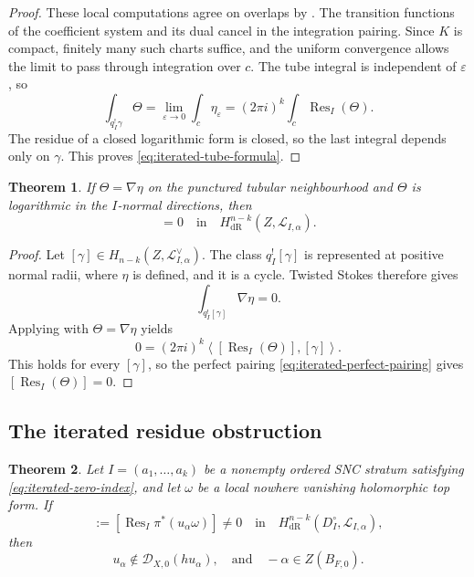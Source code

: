\documentclass[12pt]{amsart}
\numberwithin{equation}{section}
\theoremstyle{plain}
\newtheorem{theorem}{Theorem}[section]
\theoremstyle{definition}
\theoremstyle{remark}
\theoremstyle{definition}
\DeclareMathOperator{\Res}{Res}
\newcommand{\D}{\mathscr D}
\newcommand{\Lcal}{\mathscr L}
\begin{document}
\begin{proof}
These local computations agree on overlaps by . The transition functions of the coefficient system and its dual cancel in the integration pairing. Since $K$ is compact, finitely many such charts suffice, and the uniform convergence allows the limit to pass through integration over $c$. The tube integral is independent of $\varepsilon$, so
\[
\int_{q_I^!\gamma}\Theta
=
\lim_{\varepsilon\to0}\int_c\eta_\varepsilon
=
(2\pi i)^k\int_c\Res_I(\Theta).
\]
The residue of a closed logarithmic form is closed, so the last integral depends only on $\gamma$. This proves \eqref{eq:iterated-tube-formula}.
\end{proof}


\begin{theorem}\label{thm:iterated-tube-exactness}
If $\Theta=\nabla\eta$ on the punctured tubular neighbourhood and $\Theta$ is logarithmic in the $I$-normal directions, then
\begin{equation*}
[\Res_I(\Theta)]=0
 \quad\text{in}\quad
 H^{n-k}_{\mathrm{dR}}(Z,\Lcal_{I,\alpha}).
\end{equation*}
\end{theorem}

\begin{proof}
Let $[\gamma]\in H_{n-k}(Z,\Lcal_{I,\alpha}^\vee)$. The class $q_I^![\gamma]$ is represented at positive normal radii, where $\eta$ is defined, and it is a cycle. Twisted Stokes therefore gives
\begin{equation*}
\int_{q_I^![\gamma]}\nabla\eta=0.
\end{equation*}
Applying  with $\Theta=\nabla\eta$ yields
\begin{equation*}
0=(2\pi i)^k\left\langle[\Res_I(\Theta)],[\gamma]\right\rangle.
\end{equation*}
This holds for every $[\gamma]$, so the perfect pairing \eqref{eq:iterated-perfect-pairing} gives $[\Res_I(\Theta)]=0$.
\end{proof}

\subsection{The iterated residue obstruction}

\begin{theorem}
\label{thm:iterated-residue-obstruction}
Let $I=(a_1,\ldots,a_k)$ be a nonempty ordered SNC stratum satisfying \eqref{eq:iterated-zero-index}, and let $\omega$ be a local nowhere vanishing holomorphic top form. If
\begin{equation*}
[R_{I,\alpha}]
 :=[\Res_I\pi^*(u_\alpha\omega)]\ne0
 \quad\text{in}\quad
 H^{n-k}_{\mathrm{dR}}(D_I^\circ,\Lcal_{I,\alpha}),
\end{equation*}
then
\begin{equation*}
u_\alpha\notin\D_{X,0}(hu_\alpha),
 \quad \text{and}\quad 
 -\alpha\in Z(B_{F,0}).
\end{equation*}
\end{theorem}
\end{document}
